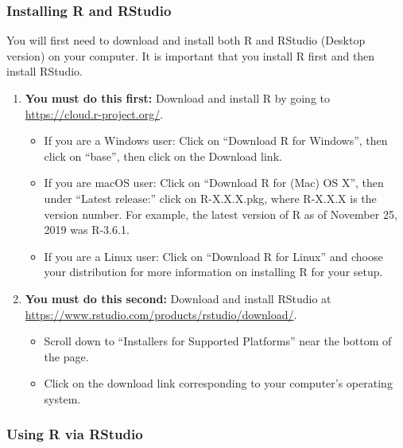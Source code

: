 \documentclass[
]{article}
\providecommand{\tightlist}{%
  \setlength{\itemsep}{0pt}\setlength{\parskip}{0pt}}
\begin{document}
\hypertarget{installing-r-and-rstudio}{%
\subsubsection{Installing R and
RStudio}\label{installing-r-and-rstudio}}

You will first need to download and install both R and RStudio (Desktop
version) on your computer. It is important that you install R first and
then install RStudio.

\begin{enumerate}
\def\labelenumi{\arabic{enumi}.}
\tightlist
\item
  \textbf{You must do this first:} Download and install R by going to
  \url{https://cloud.r-project.org/}. 

  \begin{itemize}
  \tightlist
  \item
    If you are a Windows user: Click on ``Download R for Windows'', then
    click on ``base'', then click on the Download link.
  \item
    If you are macOS user: Click on ``Download R for (Mac) OS X'', then
    under ``Latest release:'' click on R-X.X.X.pkg, where R-X.X.X is the
    version number. For example, the latest version of R as of November
    25, 2019 was R-3.6.1.
  \item
    If you are a Linux user: Click on ``Download R for Linux'' and
    choose your distribution for more information on installing R for
    your setup.
  \end{itemize}
\item
  \textbf{You must do this second:} Download and install RStudio at
  \url{https://www.rstudio.com/products/rstudio/download/}.

  \begin{itemize}
  \tightlist
  \item
    Scroll down to ``Installers for Supported Platforms'' near the
    bottom of the page.
  \item
    Click on the download link corresponding to your computer's
    operating system.
  \end{itemize}
\end{enumerate}

\hypertarget{using-r-via-rstudio}{%
\subsubsection{Using R via RStudio}\label{using-r-via-rstudio}}
\end{document}
